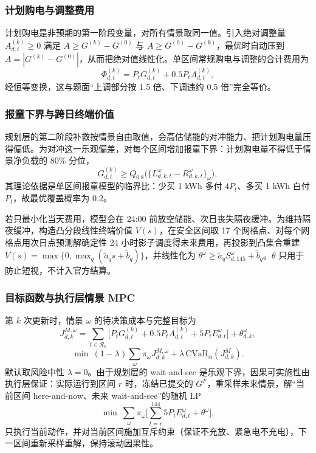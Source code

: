 \subsubsection{计划购电与调整费用}

计划购电是非预期的第一阶段变量，对所有情景取同一值。引入绝对调整量 $A^{(k)}_{d,t}\ge0$ 满足 $A\ge G^{(k)}-G^{(0)}$ 与 $A\ge G^{(0)}-G^{(k)}$，最优时自动压到 $A=|G^{(k)}-G^{(0)}|$，从而把绝对值线性化。单区间常规购电与调整的合计费用为
\begin{equation}
\Phi^{(k)}_{d,t}=P_t G^{(k)}_{d,t}+0.5P_t A^{(k)}_{d,t},\label{eq:adjust3}
\end{equation}
经恒等变换，这与题面“上调部分按 1.5 倍、下调违约 0.5 倍”完全等价。

\subsubsection{报童下界与跨日终端价值}

规划层的第二阶段补救按情景自由取值，会高估储能的对冲能力、把计划购电量压得偏低。为对冲这一乐观偏差，对每个区间增加报童下界：计划购电量不得低于情景净负载的 80\% 分位，
\begin{equation}
G^{(k)}_{d,t}\ge Q_{0.8}\big(\{L^\omega_{d,k,t}-R^\omega_{d,k,t}\}_{\omega}\big),\label{eq:newsvendor3}
\end{equation}
其理论依据是单区间报童模型的临界比：少买 1 kWh 多付 $4P_t$、多买 1 kWh 白付 $P_t$，故最优覆盖概率为 $0.2$。

若只最小化当天费用，模型会在 24:00 前放空储能、次日丧失隔夜缓冲。为维持隔夜缓冲，构造凸分段线性终端价值 $V(s)$，在安全区间取 17 个网格点、对每个网格点用次日点预测解确定性 24 小时影子调度得未来费用，再投影到凸集合重建 $V(s)=\max\{0,\max_q(\widetilde a_q s+\widetilde b_q)\}$，并线性化为 $\theta^\omega\ge\widetilde a_q S^\omega_{d,145}+\widetilde b_q$。$\theta$ 只用于防止短视，不计入官方结算。

\subsubsection{目标函数与执行层情景 MPC}

第 $k$ 次更新时，情景 $\omega$ 的待决策成本与完整目标为
\begin{equation}
J^{M,\omega}_{d,k}=\sum_{t\in\mathcal R_k}\Big[P_t G^{(k)}_{d,t}+0.5P_t A^{(k)}_{d,t}+5P_t E^\omega_{d,t}\Big]+\theta^\omega_{d,k},\label{eq:cost3}
\end{equation}
\begin{equation}
\min\ (1-\lambda)\sum_{\omega}\pi_\omega J^{M,\omega}_{d,k}+\lambda\,\mathrm{CVaR}_\alpha(J^{M}_{d,k}).\label{eq:obj3}
\end{equation}
默认取风险中性 $\lambda=0$。由于规划层的 wait-and-see 是乐观下界，因果可实施性由执行层保证：实际运行到区间 $r$ 时，冻结已提交的 $G^F$，重采样未来情景，解“当前区间 here-and-now、未来 wait-and-see”的随机 LP
\begin{equation}
\min\ \sum_{\omega}\pi_\omega\Big[\sum_{t=r}^{144}5P_t E^\omega_{d,t}+\theta^\omega\Big],\label{eq:mpc3}
\end{equation}
只执行当前动作，并对当前区间施加互斥约束（保证不充放、紧急电不充电），下一区间重新采样重解，保持滚动因果性。

